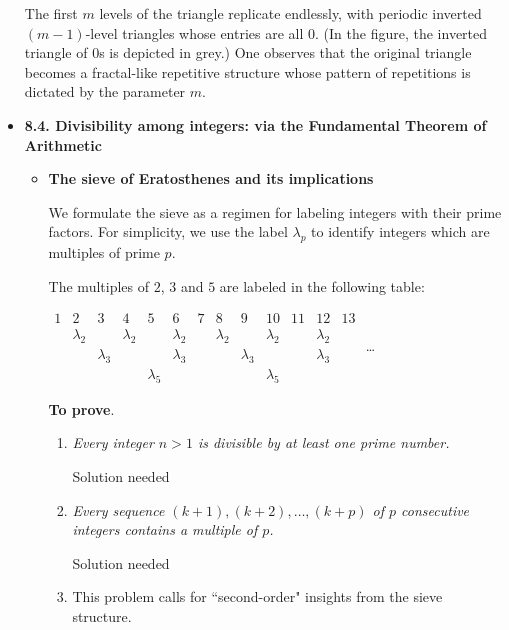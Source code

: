 \begin{itemize}
The first $m$ levels of the triangle replicate endlessly, with periodic inverted $(m-1)$-level triangles whose entries are all $0$.  (In the figure, the inverted triangle of $0$s is depicted in grey.)   One observes that the original triangle becomes a fractal-like repetitive structure whose pattern of repetitions is dictated by the parameter $m$.

%
\medskip\item
{\bf 8.4. Divisibility among integers: via the Fundamental Theorem of Arithmetic}

  \begin{itemize}
\item
{\bf The sieve of Eratosthenes and its implications}

We formulate the sieve as a regimen for labeling integers with their prime factors.  For simplicity, we use the label $\lambda_p$ to identify integers which are multiples of prime $p$.

\medskip

The multiples of $2$, $3$ and $5$ are labeled in the following table:

\medskip

\hspace*{.25in}
$\begin{array}{c|c|c|c|c|c|c|c|c|c|c|c|c}
1 & 2 & 3 & 4 & 5 & 6 & 7 & 8 & 9 & 10 & 11 & 12 & 13 \\
 & \lambda_2 & & \lambda_2 & & \lambda_2 & & \lambda_2 & & \lambda_2 & & \lambda_2 & \\
 & & \lambda_3 & &  & \lambda_3 & & & \lambda_3 & & & \lambda_3 & \\
 & & & & \lambda_5 & & & & & \lambda_5 & & & 
\end{array}$ \ldots

\bigskip

{\bf To prove}.
     \begin{enumerate}
     \item
{\em Every integer $n>1$ is divisible by at least one prime number.}

{\Arny Solution needed}
     \medskip\item
{\em Every sequence $(k+1), (k+2), \ldots, (k+p)$ of $p$ consecutive integers contains a multiple of $p$.}

{\Arny Solution needed}

      \medskip\item 
This problem calls for ``second-order" insights from the sieve structure.

\smallskip


\end{enumerate}
\end{itemize}
\end{itemize}
